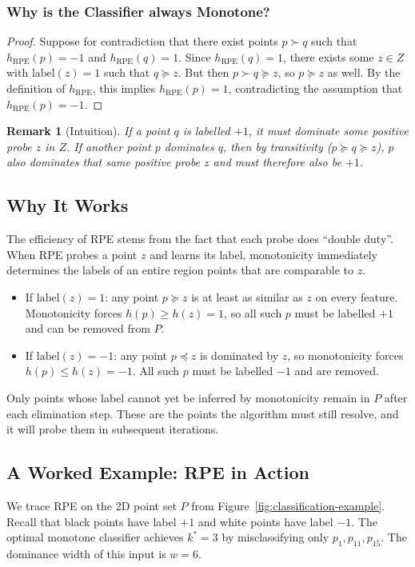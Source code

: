 \documentclass[11pt, a4paper]{article}
\theoremstyle{boxed}
\newtheorem{innerremark}{Remark}[section]
\newenvironment{remark}
  {\begin{mdframed}[style=notestyle]\begin{innerremark}}
  {\end{innerremark}\end{mdframed}}
\begin{document}
\subsubsection*{Why is the Classifier always Monotone?} 
\begin{proof}
Suppose for contradiction that there exist points $p \succ q$ such that $h_{\text{RPE}}(p) = -1$ and $h_{\text{RPE}}(q) = 1$. Since $h_{\text{RPE}}(q) = 1$, there exists some $z \in Z$ with $\text{label}(z) = 1$ such that $q \succeq z$. But then $p \succ q \succeq z$, so $p \succeq z$ as well. By the definition of $h_{\text{RPE}}$, this implies $h_{\text{RPE}}(p) = 1$, contradicting the assumption that $h_{\text{RPE}}(p) = -1$.
\end{proof}

\begin{remark}[Intuition]
If a point $q$ is labelled $+1$, it must dominate some positive probe $z$ in $Z$. If another point $p$ dominates $q$, then by transitivity ($p \succeq q \succeq z$), 
$p$ also dominates that same positive probe $z$ and must therefore also be $+1$.
\end{remark}

\subsection{Why It Works}
The efficiency of RPE stems from the fact that each probe does ``double duty''. When RPE probes a point $z$ and learns its label, monotonicity immediately determines the labels of an entire region points that are comparable to $z$.
\begin{itemize}
  \item If $\text{label}(z) = 1$: any point $p \succeq z$ is at least as similar as $z$ on every feature. Monotonicity forces $h(p) \ge h(z) = 1$, so all such $p$ must be labelled $+1$ and can be removed from $P$.
  \item If $\text{label}(z) = -1$: any point $p \preceq z$ is dominated by $z$, so monotonicity forces $h(p) \le h(z) = -1$. All such $p$ must be labelled $-1$ and are removed.
\end{itemize}

Only points whose label cannot yet be inferred by monotonicity remain in $P$ after each elimination step. These are the points the algorithm must still resolve, and it will probe them in subsequent iterations.

\subsection{A Worked Example: RPE in Action}
We trace RPE on the 2D point set $P$ from Figure~\ref{fig:classification-example}. Recall that black points have label $+1$ and white points have label $-1$. The optimal monotone classifier achieves $k^* = 3$ by misclassifying only $p_1, p_{11}, p_{15}$. The dominance width of this input is $w = 6$.
\end{document}
